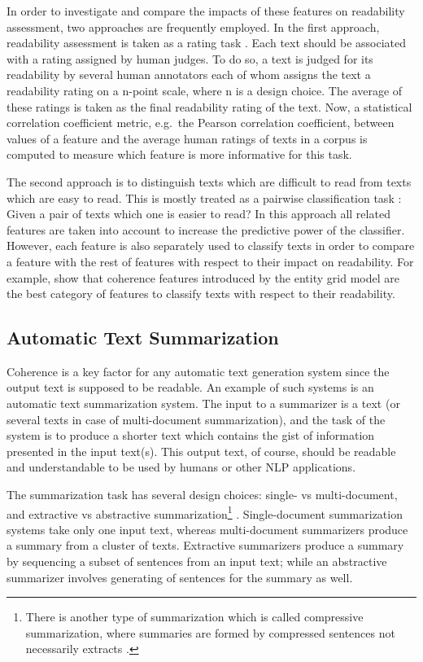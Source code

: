 In order to investigate and compare the impacts of these features on readability assessment, two approaches are frequently employed. 
In the first approach, readability assessment is taken as a rating task \cite{pitler08,kate10}. 
Each text should be associated with a rating assigned by human judges. 
To do so, a text is judged for its readability by several human annotators each of whom assigns the text a readability rating on a n-point scale, where n is a design choice.  
The average of these ratings is taken as the final readability rating of the text. 
Now, a statistical correlation coefficient metric, e.g.\ the Pearson correlation coefficient, between values of a feature and the average human ratings of texts in a corpus is computed to measure which feature is more informative for this task. 

The second approach is to distinguish texts which are difficult to read from texts which are easy to read. 
This is mostly treated as a pairwise classification task \cite{pitler08,guinaudeau13,barzilay08}: Given a pair of texts which one is easier to read? 
In this approach all related features are taken into account to increase the predictive power of the classifier. 
However, each feature is also separately used to classify texts in order to compare a feature with the rest of features with respect to their impact on readability.  
For example,  show that coherence features introduced by the entity grid model are the best category of features to classify texts with respect to their readability. 

\subsection{Automatic Text Summarization}

Coherence is a key factor for any automatic text generation system since the output text is supposed to be readable. 
An example of such systems is an automatic text summarization system.
The input to a summarizer is a text (or several texts in case of multi-document summarization), and the task of the system is to produce a shorter text which contains the gist of information presented in the input text(s). 
This output text, of course, should be readable and understandable to be used by humans or other NLP applications. 

The summarization task has several design choices: single- vs multi-document, and extractive vs abstractive summarization\footnote{There is another type of summarization which is called compressive summarization, where summaries are formed by compressed sentences not necessarily extracts \cite{knight00}.} \cite{hahn00}. 
Single-document summarization systems take only one input text, whereas multi-document summarizers produce a summary from a cluster of texts. 
Extractive summarizers \cite{kupiec95,carbonell98,gillick09} produce a summary by sequencing a subset of sentences from an input text; while an abstractive summarizer \cite{wanglu13b,alfonseca13} involves generating of sentences for the summary as well.   

